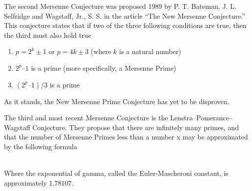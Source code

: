 The second Mersenne Conjecture was proposed 1989 by P. T. Bateman, J. L. Selfridge and
Wagstaff, Jr., S. S. in the article “The New Mersenne Conjecture.” This conjecture states that if
two of the three following conditions are true, then the third must also hold true

\begin{enumerate}
\item $p = 2^k \pm 1$ or $p = 4k \pm 3$ (where $k$ is a natural number)
\item $2^p – 1$ is a prime (more specifically, a Mersenne Prime)
\item $(2^p – 1)/3$ is a prime
\end{enumerate}

As it stands, the New Mersenne Prime Conjecture has yet to be disproven.

The third and most recent Mersenne Conjecture is the Lenstra–Pomerance–Wagstaff
Conjecture. They propose that there are infinitely many primes, and that the number of
Mersenne Primes less than a number x may be approximated by the following formula

\begin{align}
\end{align}

Where the exponential of gamma, called the Euler-Mascheroni constant, is approximately
1.78107.
